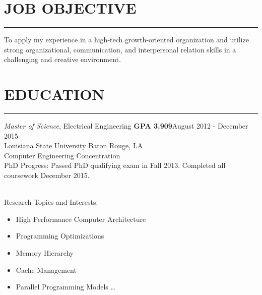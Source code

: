 \documentclass{res}
\begin{document}
 


\address{\bf  PRESENT ADDRESS\\Southlake Avenue\\Baton Rouge, LA 70804}
\address{\bf PERMANENT ADDRESS \\Smith Drive\\  Walker , LA 70785}
                                  
\begin{resume}

\section{JOB OBJECTIVE}
	\rule{\textwidth}{0.5pt}
    To apply my experience in a high-tech growth-oriented organization and utilize strong organizational, communication, and interpersonal relation skills in a challenging and creative environment.      
    
\section{EDUCATION}
	\rule{\textwidth}{0.5pt}
	\vspace{-0.3in} 
	
	{\sl Master of Science}, Electrical Engineering {\bf GPA 3.909}\hfill August 2012 - December 2015\\ 
	Louisiana State University \hfill Baton Rouge, LA\\   
	{\footnotesize Computer Engineering Concentration\\
	PhD Progress: Passed PhD qualifying exam in Fall 2013. Completed all coursework  December 2015.}\\\\
	\vspace{-0.49in}
	\begin{multicols}{2}
	{\footnotesize 
		Research Topics and Interests: \vspace{-0.175in}
		\begin{itemize}
			\item High Performance Computer Architecture
			\item Programming Optimizations
			\item Memory Hierarchy
			\item Cache Management
			\item Parallel Programming Models \ldots
			\end{itemize}
		
}
\end{multicols}
\end{resume}
\end{document}
